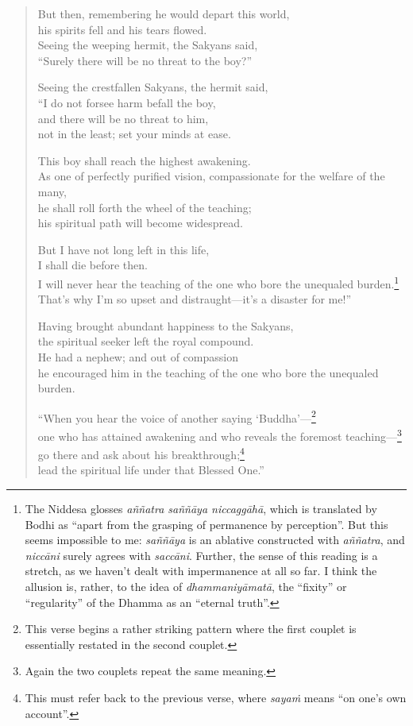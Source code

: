 \documentclass[12pt,openany]{book}%
\begin{document}
\begin{verse}
But then, remembering he would depart this world, \\
his spirits fell and his tears flowed. \\
Seeing the weeping hermit, the Sakyans said, \\
“Surely there will be no threat to the boy?” 

Seeing the crestfallen Sakyans, the hermit said, \\
“I do not forsee harm befall the boy, \\
and there will be no threat to him, \\
not in the least; set your minds at ease. 

This boy shall reach the highest awakening. \\
As one of perfectly purified vision, compassionate for the welfare of the many, \\
he shall roll forth the wheel of the teaching; \\
his spiritual path will become widespread. 

But I have not long left in this life, \\
I shall die before then. \\
I will never hear the teaching of the one who bore the unequaled burden.\footnote{The Niddesa glosses \textit{\textsanskrit{aññatra} \textsanskrit{saññāya} \textsanskrit{niccaggāhā}}, which is translated by Bodhi as “apart from the grasping of permanence by perception”. But this seems impossible to me: \textit{\textsanskrit{saññāya}} is an ablative constructed with \textit{\textsanskrit{aññatra}}, and \textit{\textsanskrit{niccāni}} surely agrees with \textit{\textsanskrit{saccāni}}. Further, the sense of this reading is a stretch, as we haven’t dealt with impermanence at all so far. I think the allusion is, rather, to the idea of \textit{\textsanskrit{dhammaniyāmatā}}, the “ﬁxity” or “regularity” of the Dhamma as an “eternal truth”. } \\
That’s why I’m so upset and distraught—it’s a disaster for me!” 

Having brought abundant happiness to the Sakyans, \\
the spiritual seeker left the royal compound. \\
He had a nephew; and out of compassion \\
he encouraged him in the teaching of the one who bore the unequaled burden. 

“When you hear the voice of another saying ‘Buddha’—\footnote{This verse begins a rather striking pattern where the first couplet is essentially restated in the second couplet. } \\
one who has attained awakening and who reveals the foremost teaching—\footnote{Again the two couplets repeat the same meaning. } \\
go there and ask about his breakthrough;\footnote{This must refer back to the previous verse, where \textit{\textsanskrit{sayaṁ}} means “on one’s own account”. } \\
lead the spiritual life under that Blessed One.” 


\end{verse}
\end{document}

